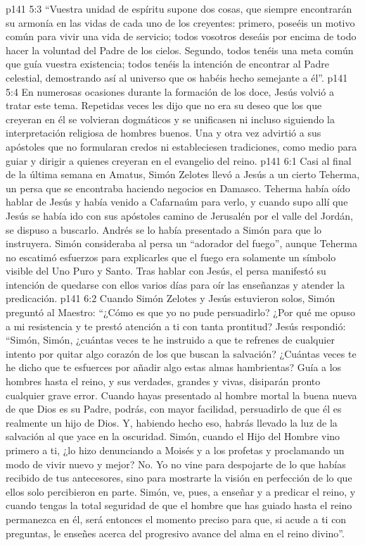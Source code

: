 \vs p141 5:3 “Vuestra unidad de espíritu supone dos cosas, que siempre encontrarán su armonía en las vidas de cada uno de los creyentes: primero, poseéis un motivo común para vivir una vida de servicio; todos vosotros deseáis por encima de todo hacer la voluntad del Padre de los cielos. Segundo, todos tenéis una meta común que guía vuestra existencia; todos tenéis la intención de encontrar al Padre celestial, demostrando así al universo que os habéis hecho semejante a él”.
\vs p141 5:4 En numerosas ocasiones durante la formación de los doce, Jesús volvió a tratar este tema. Repetidas veces les dijo que no era su deseo que los que creyeran en él se volvieran dogmáticos y se unificasen ni incluso siguiendo la interpretación religiosa de hombres buenos. Una y otra vez advirtió a sus apóstoles que no formularan credos ni estableciesen tradiciones, como medio para guiar y dirigir a quienes creyeran en el evangelio del reino.
\vs p141 6:1 Casi al final de la última semana en Amatus, Simón Zelotes llevó a Jesús a un cierto Teherma, un persa que se encontraba haciendo negocios en Damasco. Teherma había oído hablar de Jesús y había venido a Cafarnaúm para verlo, y cuando supo allí que Jesús se había ido con sus apóstoles camino de Jerusalén por el valle del Jordán, se dispuso a buscarlo. Andrés se lo había presentado a Simón para que lo instruyera. Simón consideraba al persa un “adorador del fuego”, aunque Teherma no escatimó esfuerzos para explicarles que el fuego era solamente un símbolo visible del Uno Puro y Santo. Tras hablar con Jesús, el persa manifestó su intención de quedarse con ellos varios días para oír las enseñanzas y atender la predicación.
\vs p141 6:2 Cuando Simón Zelotes y Jesús estuvieron solos, Simón preguntó al Maestro: “¿Cómo es que yo no pude persuadirlo? ¿Por qué me opuso a mi resistencia y te prestó atención a ti con tanta prontitud? Jesús respondió: “Simón, Simón, ¿cuántas veces te he instruido a que te refrenes de cualquier intento por quitar algo  corazón de los que buscan la salvación? ¿Cuántas veces te he dicho que te esfuerces por añadir algo  estas almas hambrientas? Guía a los hombres hasta el reino, y sus verdades, grandes y vivas, disiparán pronto cualquier grave error. Cuando hayas presentado al hombre mortal la buena nueva de que Dios es su Padre, podrás, con mayor facilidad, persuadirlo de que él es realmente un hijo de Dios. Y, habiendo hecho eso, habrás llevado la luz de la salvación al que yace en la oscuridad. Simón, cuando el Hijo del Hombre vino primero a ti, ¿lo hizo denunciando a Moisés y a los profetas y proclamando un modo de vivir nuevo y mejor? No. Yo no vine para despojarte de lo que habías recibido de tus antecesores, sino para mostrarte la visión en perfección de lo que ellos solo percibieron en parte. Simón, ve, pues, a enseñar y a predicar el reino, y cuando tengas la total seguridad de que el hombre que has guiado hasta el reino permanezca en él, será entonces el momento preciso para que, si acude a ti con preguntas, le enseñes acerca del progresivo avance del alma en el reino divino”.
